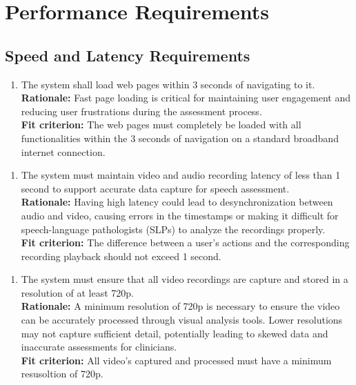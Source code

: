 \documentclass[12pt]{article}
\begin{document}
\section{Performance Requirements}
\subsection{Speed and Latency Requirements}
\begin{enumerate}[{PR-SL}1. ]
  \item The system shall load web pages within 3 seconds of navigating to it.\\
  \textbf{Rationale: }Fast page loading is critical for maintaining user engagement and reducing user frustrations during the assessment process.\\
  \textbf{Fit criterion: }The web pages must completely be loaded with all functionalities within the 3 seconds of navigation on a standard broadband internet connection.  
\end{enumerate}
\begin{enumerate}[{PR-SL}2. ]
  \item The system must maintain video and audio recording latency of less than 1 second to support accurate data capture for speech assessment.\\
  \textbf{Rationale: }Having high latency could lead to desynchronization between audio and video, causing errors in the timestamps or making it difficult for speech-language pathologists (SLPs) to analyze the recordings properly.\\
  \textbf{Fit criterion: }The difference between a user's actions and the corresponding recording playback should not exceed 1 second.  
\end{enumerate}
\begin{enumerate}[{PR-SL}3. ]
  \item The system must ensure that all video recordings are capture and stored in a resolution of at least 720p.\\
  \textbf{Rationale: }A minimum resolution of 720p is necessary to ensure the video can be accurately processed through visual analysis tools. Lower resolutions may not capture sufficient detail, potentially leading to skewed data and inaccurate assessments for clinicians.\\
  \textbf{Fit criterion: }All video's captured and processed must have a minimum resusoltion of 720p.
\end{enumerate}
\end{document}
